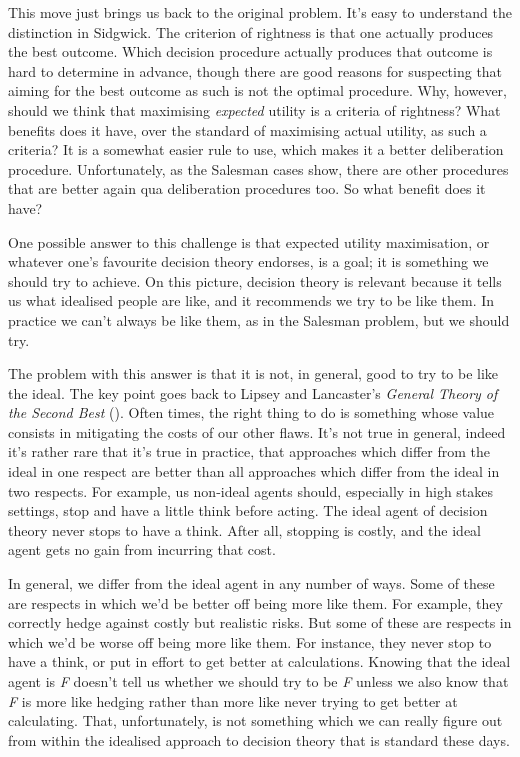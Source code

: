 \documentclass[
  12pt,
  letterpaper,
  DIV=11,
  numbers=noendperiod,
  twoside]{scrartcl}
\begin{document}
This move just brings us back to the original problem. It's easy to
understand the distinction in Sidgwick. The criterion of rightness is
that one actually produces the best outcome. Which decision procedure
actually produces that outcome is hard to determine in advance, though
there are good reasons for suspecting that aiming for the best outcome
as such is not the optimal procedure. Why, however, should we think that
maximising \emph{expected} utility is a criteria of rightness? What
benefits does it have, over the standard of maximising actual utility,
as such a criteria? It is a somewhat easier rule to use, which makes it
a better deliberation procedure. Unfortunately, as the Salesman cases
show, there are other procedures that are better again qua deliberation
procedures too. So what benefit does it have?

One possible answer to this challenge is that expected utility
maximisation, or whatever one's favourite decision theory endorses, is a
goal; it is something we should try to achieve. On this picture,
decision theory is relevant because it tells us what idealised people
are like, and it recommends we try to be like them. In practice we can't
always be like them, as in the Salesman problem, but we should try.

The problem with this answer is that it is not, in general, good to try
to be like the ideal. The key point goes back to Lipsey and Lancaster's
\emph{General Theory of the Second Best}
(). Often
times, the right thing to do is something whose value consists in
mitigating the costs of our other flaws. It's not true in general,
indeed it's rather rare that it's true in practice, that approaches
which differ from the ideal in one respect are better than all
approaches which differ from the ideal in two respects. For example, us
non-ideal agents should, especially in high stakes settings, stop and
have a little think before acting. The ideal agent of decision theory
never stops to have a think. After all, stopping is costly, and the
ideal agent gets no gain from incurring that cost.

In general, we differ from the ideal agent in any number of ways. Some
of these are respects in which we'd be better off being more like them.
For example, they correctly hedge against costly but realistic risks.
But some of these are respects in which we'd be worse off being more
like them. For instance, they never stop to have a think, or put in
effort to get better at calculations. Knowing that the ideal agent is
\emph{F} doesn't tell us whether we should try to be \emph{F} unless we
also know that \emph{F} is more like hedging rather than more like never
trying to get better at calculating. That, unfortunately, is not
something which we can really figure out from within the idealised
approach to decision theory that is standard these days.
\end{document}
